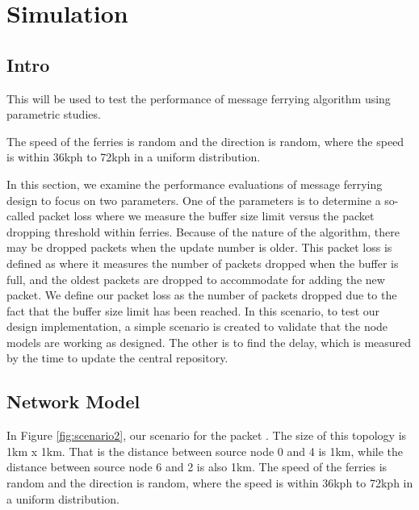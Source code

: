 \chapter{Simulation}

\section{Intro}

This will be used to test the performance of message ferrying algorithm using parametric studies.  

The speed of the ferries is random and the direction is random, where the speed is within 36kph to 72kph in a uniform distribution.  

In this section, we examine the performance evaluations of message ferrying design to focus on two parameters.  
One of the parameters is to determine a so-called packet loss where we measure the buffer size limit versus the packet dropping threshold within ferries.
Because of the nature of the algorithm, there may be dropped packets when the update number is older.
This packet loss is defined as where it measures the number of packets dropped when the buffer is full, and the oldest packets are dropped to accommodate for adding the new packet.  
We define our packet loss as the number of packets dropped due to the fact that the buffer size limit has been reached.
In this scenario, to test our design implementation, a simple scenario is created to validate that the node models are working as designed.  
The other is to find the delay, which is measured by the time to update the central repository.

\section{Network Model}

In Figure \ref{fig:scenario2}, our scenario for the packet .  The size of this topology is 1km x 1km.  
That is the distance between source node 0 and 4 is 1km, while the distance between source node 6 and 2 is also 1km.  
The speed of the ferries is random and the direction is random, where the speed is within 36kph to 72kph in a uniform distribution.  

